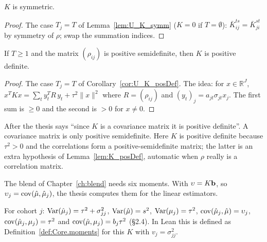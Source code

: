 \begin{lemma}\label{lem:K_symm}
  \leanok
  $K$ is symmetric.
\end{lemma}
\begin{proof}
  \leanok
  The case $T_j = T$ of Lemma~\ref{lem:U_K_symm} ($K = 0$ if $T = \emptyset$):
  $\bar K_{ij}^{ts} = \bar K_{ji}^{st}$ by symmetry of $\rho$; swap the
  summation indices.
\end{proof}

\begin{lemma}\label{lem:K_posDef}
  \leanok
  If $T \ge 1$ and the matrix $(\rho_{ij})$ is positive semidefinite, then
  $K$ is positive definite.
\end{lemma}
\begin{proof}
  \leanok
  The case $T_j = T$ of Corollary~\ref{cor:U_K_posDef}. The idea: for $x \in \mathbb R^J$,
  $x^T K x = \sum_t y_t^T R\, y_t + \tau^2\lVert x\rVert^2$ where
  $R = (\rho_{ij})$ and $(y_t)_j = a_{jt}\sigma_{jt}x_j$. The first sum is
  $\ge 0$ and the second is $> 0$ for $x \ne 0$.
\end{proof}

\begin{remark}\label{rem:posdef}
  After  the thesis says ``since $K$ is a covariance matrix it is
  positive definite''. A covariance matrix is only positive semidefinite.
  Here $K$ is positive definite because $\tau^2 > 0$ and the correlations
  form a positive-semidefinite matrix; the latter is an extra hypothesis of
  Lemma~\ref{lem:K_posDef}, automatic when $\rho$ really is a correlation
  matrix.
\end{remark}

The blend of Chapter~\ref{ch:blend} needs six moments. With
$\upsilon = K\mathbf{b}$, so $\upsilon_j = \operatorname{cov}(\hat\mu, \hat\mu_j)$, the thesis computes
them for the linear estimators.

\begin{definition}\label{def:moments}
  \leanok
  For cohort $j$: $\operatorname{Var}(\hat\mu_j) = \tau^2 + \sigma_{jj}^2$,
  $\operatorname{Var}(\hat\mu) = s^2$, $\operatorname{Var}(\mu_j) = \tau^2$,
  $\operatorname{cov}(\hat\mu_j, \hat\mu) = \upsilon_j$, $\operatorname{cov}(\hat\mu_j, \mu_j) = \tau^2$ and
  $\operatorname{cov}(\hat\mu, \mu_j) = b_j\tau^2$ (§2.4). In Lean this is defined as
  Definition~\ref{def:Core.moments} for this $K$ with $v_j = \sigma^2_{jj}$.
\end{definition}

